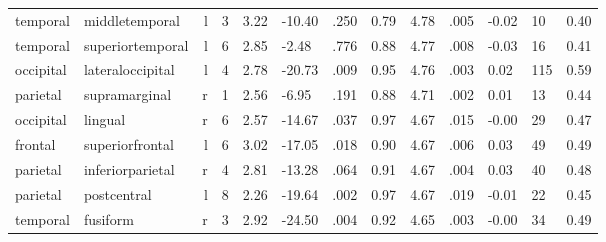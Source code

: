 \documentclass{article}
\begin{document}
\begin{longtable}{llrR{1.3cm}R{1cm}R{1.3cm}R{1cm}R{1cm}R{1.3cm}R{1cm}R{1.8cm}R{1.3cm}R{1.8cm}}
  temporal &            middletemporal &    l &         3 &                  3.22 &           -10.40 &               .250 &                               0.79 &                          4.78 &                            .005 &  -0.02 &     10 &      0.40 \\
  temporal &          superiortemporal &    l &         6 &                  2.85 &            -2.48 &               .776 &                               0.88 &                          4.77 &                            .008 &  -0.03 &     16 &      0.41 \\
 occipital &          lateraloccipital &    l &         4 &                  2.78 &           -20.73 &               .009 &                               0.95 &                          4.76 &                            .003 &   0.02 &    115 &      0.59 \\
  parietal &             supramarginal &    r &         1 &                  2.56 &            -6.95 &               .191 &                               0.88 &                          4.71 &                            .002 &   0.01 &     13 &      0.44 \\
 occipital &                   lingual &    r &         6 &                  2.57 &           -14.67 &               .037 &                               0.97 &                          4.67 &                            .015 &  -0.00 &     29 &      0.47 \\
   frontal &           superiorfrontal &    l &         6 &                  3.02 &           -17.05 &               .018 &                               0.90 &                          4.67 &                            .006 &   0.03 &     49 &      0.49 \\
  parietal &          inferiorparietal &    r &         4 &                  2.81 &           -13.28 &               .064 &                               0.91 &                          4.67 &                            .004 &   0.03 &     40 &      0.48 \\
  parietal &               postcentral &    l &         8 &                  2.26 &           -19.64 &               .002 &                               0.97 &                          4.67 &                            .019 &  -0.01 &     22 &      0.45 \\
  temporal &                  fusiform &    r &         3 &                  2.92 &           -24.50 &               .004 &                               0.92 &                          4.65 &                            .003 &  -0.00 &     34 &      0.49 \\

\end{longtable}
\end{document}
